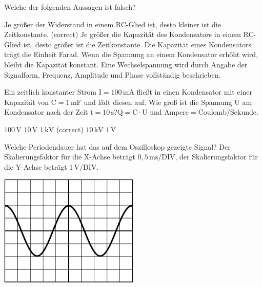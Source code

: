 \documentclass[11pt]{exam}
\begin{document}
\setlength{\voffset}{-0.5in}
\setlength{\headsep}{5pt}

\hspace{2mm}
 \hspace{5mm}
\vspace{4mm}

\begin{questions}

\question Welche der folgenden Aussagen ist falsch?

\begin{choices}
	\choice Je größer der Widerstand in einem RC-Glied ist, desto kleiner ist die Zeitkonstante. (correct)
	\choice Je größer die Kapazität des Kondensators in einem RC-Glied ist, desto größer ist die Zeitkonstante.
	\choice Die Kapazität eines Kondensators trägt die Einheit Farad.
	\choice Wenn die Spannung an einem Kondensator erhöht wird, bleibt die Kapazität konstant.
	\choice Eine Wechselspannung wird durch Angabe der Signalform, Frequenz, Amplitude und Phase vollständig beschrieben.
\end{choices}

\vspace{3mm}\question Ein zeitlich konstanter Strom \(\mathrm{I=100\,mA}\) fließt in einen Kondensator mit einer Kapazität von \(\mathrm{C=1\,mF}\) und lädt diesen auf. Wie groß ist die Spannung \(\mathrm{U}\) am Kondensator nach der Zeit \(\mathrm{t=10\,s}\)?\(\mathrm{Q=C \cdot U}\) und \(\mathrm{Ampere=Coulomb/Sekunde}\).

\begin{choices}
	\choice \(\mathrm{100\,V}\)
	\choice \(\mathrm{10\,V}\)
	\choice \(\mathrm{1\,kV}\) (correct)
	\choice \(\mathrm{10\,kV}\)
	\choice \(\mathrm{1\,V}\)
\end{choices}

\vspace{3mm}\question Welche Periodendauer hat das auf dem Oszilloskop gezeigte Signal? Der Skalierungsfaktor für die X-Achse beträgt \(\mathrm{0,5\,ms/DIV}\), der Skalierungsfaktor für die Y-Achse beträgt \(\mathrm{1\,V/DIV}\). 

\includegraphics[width=0.5\textwidth]{../../../questions/D/images/Oszi2.png}


\end{questions}
\end{document}
